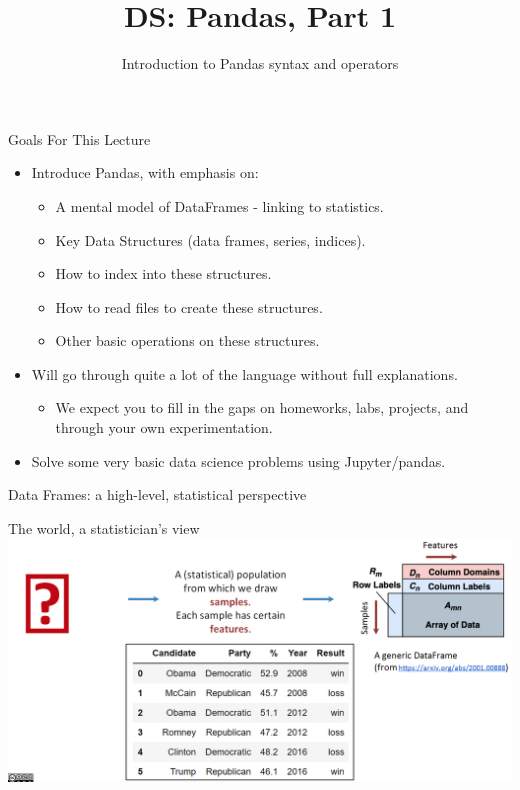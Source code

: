 \documentclass[aspectratio=169]{../latex_main/tntbeamer}  %
\title[Introduction]{DS: Pandas, Part 1}
\subtitle{Introduction to Pandas syntax and operators}
\begin{document}
	
	\maketitle
	
	\begin{frame}{ Goals For This Lecture}
	   \begin{itemize}
	       \item Introduce Pandas, with emphasis on:
	       \begin{itemize}
	           \item A mental model of DataFrames - linking to statistics.
	           \item Key Data Structures (data frames, series, indices).
	           \item How to index into these structures.
	           \item How to read files to create these structures.
	           \item Other basic operations on these structures.
	       \end{itemize}
	       \item Will go through quite a lot of the language without full explanations. 
	       \begin{itemize}
	           \item We expect you to fill in the gaps on homeworks, labs, projects, and through your own experimentation.
	       \end{itemize}
	       \item Solve some very basic data science problems using Jupyter/pandas.
	   \end{itemize}
	\end{frame}
	
	\begin{frame}{Data Frames: a high-level, statistical perspective}
	    
	\end{frame}
	
	\begin{frame}{The world, a statistician's view }
	    \includegraphics[scale=.36]{Bild1}
	\end{frame}
	
\end{document}
